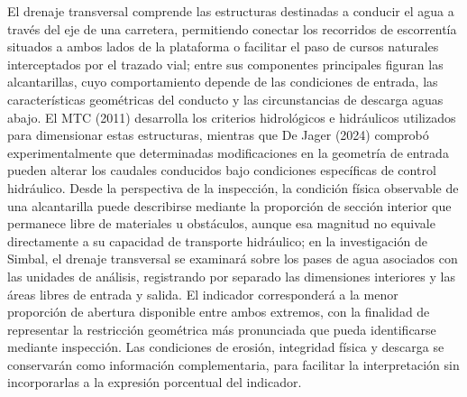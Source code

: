 
El drenaje transversal comprende las estructuras destinadas a conducir el agua a través del eje de una carretera, permitiendo conectar los recorridos de escorrentía situados a ambos lados de la plataforma o facilitar el paso de cursos naturales interceptados por el trazado vial; entre sus componentes principales figuran las alcantarillas, cuyo comportamiento depende de las condiciones de entrada, las características geométricas del conducto y las circunstancias de descarga aguas abajo. El MTC (2011) desarrolla los criterios hidrológicos e hidráulicos utilizados para dimensionar estas estructuras, mientras que De Jager (2024) comprobó experimentalmente que determinadas modificaciones en la geometría de entrada pueden alterar los caudales conducidos bajo condiciones específicas de control hidráulico. Desde la perspectiva de la inspección, la condición física observable de una alcantarilla puede describirse mediante la proporción de sección interior que permanece libre de materiales u obstáculos, aunque esa magnitud no equivale directamente a su capacidad de transporte hidráulico; en la investigación de Simbal, el drenaje transversal se examinará sobre los pases de agua asociados con las unidades de análisis, registrando por separado las dimensiones interiores y las áreas libres de entrada y salida. El indicador corresponderá a la menor proporción de abertura disponible entre ambos extremos, con la finalidad de representar la restricción geométrica más pronunciada que pueda identificarse mediante inspección. Las condiciones de erosión, integridad física y descarga se conservarán como información complementaria, para facilitar la interpretación sin incorporarlas a la expresión porcentual del indicador.


